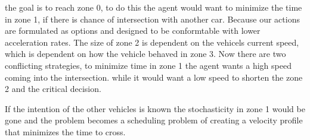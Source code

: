the goal is to reach zone 0, 
to do this the agent would want to minimize the time in zone 1, if there is chance of intersection with another car.
Because our actions are formulated as options and designed to be conformtable with lower acceleration rates. The size of zone 2 is dependent on the vehicels current speed, which is dependent on how the vehicle behaved in zone 3. 
Now there are two conflicting strategies, to minimize time in zone 1 the agent wants a high speed coming into the intersection. while it would want a low speed to shorten the zone 2 and the critical decision. 

If the intention of the other vehicles is known the stochasticity in zone 1 would be gone and the problem becomes a scheduling problem of creating a velocity profile that minimizes the time to cross.  

